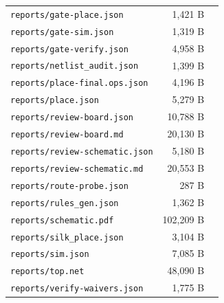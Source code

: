 \documentclass[11pt,a4paper]{article}
\begin{document}
{\begin{longtable}{p{9cm}rp{4cm}}
\texttt{reports/gate-place.json} & 1,421 B &  \\
\texttt{reports/gate-sim.json} & 1,319 B &  \\
\texttt{reports/gate-verify.json} & 4,958 B &  \\
\texttt{reports/netlist\_audit.json} & 1,399 B &  \\
\texttt{reports/place-final.ops.json} & 4,196 B &  \\
\texttt{reports/place.json} & 5,279 B &  \\
\texttt{reports/review-board.json} & 10,788 B &  \\
\texttt{reports/review-board.md} & 20,130 B &  \\
\texttt{reports/review-schematic.json} & 5,180 B &  \\
\texttt{reports/review-schematic.md} & 20,553 B &  \\
\texttt{reports/route-probe.json} & 287 B &  \\
\texttt{reports/rules\_gen.json} & 1,362 B &  \\
\texttt{reports/schematic.pdf} & 102,209 B &  \\
\texttt{reports/silk\_place.json} & 3,104 B &  \\
\texttt{reports/sim.json} & 7,085 B &  \\
\texttt{reports/top.net} & 48,090 B &  \\
\texttt{reports/verify-waivers.json} & 1,775 B &  \\
\bottomrule
\end{longtable}
}
\end{document}

